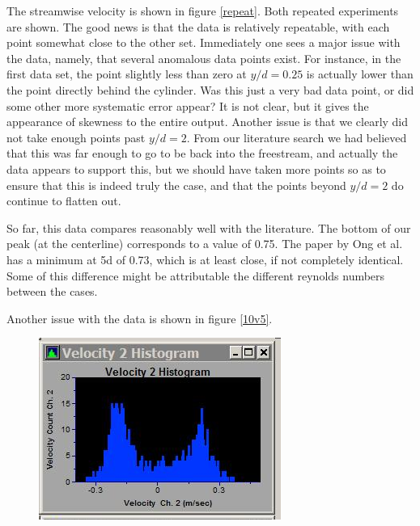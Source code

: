 \documentclass{article}
\begin{document}
The streamwise velocity is shown in figure \ref{repeat}. Both repeated
experiments are shown. The good news is that the data is relatively
repeatable, with each point somewhat close to the other set. 
Immediately one sees a major issue with the data,
namely, that several anomalous data points exist. For instance, in the
first data set, the point slightly less than zero at $y/d=0.25$ is
actually lower than the point directly behind the cylinder. Was this
just a very bad data point, or did some other more systematic error
appear? It is not clear, but it gives the appearance of skewness to the
entire output. Another issue is that we clearly did not take enough
points past $y/d=2$. From our literature search we had believed that
this was far enough to go to be back into the freestream, and actually
the data appears to support this, but we should have taken more points
so as to ensure that this is indeed truly the case, and that the points
beyond $y/d=2$ do continue to flatten out.

So far, this data compares reasonably well with the literature. The
bottom of our peak (at the centerline) corresponds to a value of
0.75. The paper by Ong et al. has a minimum at 5d of 0.73, which is at
least close, if not completely identical. Some of this difference might
be attributable the different reynolds numbers between the cases. 

Another issue with the data is shown in figure \ref{10v5}. 

\begin{figure}[!htb]
 \begin{center}
  \includegraphics[width = 12 cm]{figs/backflow}
  \caption{}
  \label{back}
 \end{center}
\end{figure}
\end{document}
